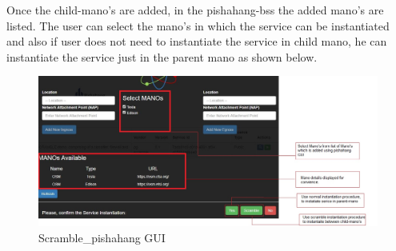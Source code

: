 Once the child-mano's are added, in the pishahang-bss the added mano's are listed. The user can select the mano's in which the service can be instantiated and also if user does not need to instantiate the service in child mano, he can instantiate the service just in the parent mano as shown below.
\begin{figure}[H]
	\centering
	\includegraphics[width=1\linewidth]{"figures/son-bss"}
	\caption{Scramble_pishahang GUI}
	\label{fig:sequence-diagram-scramble}
\end{figure}
  